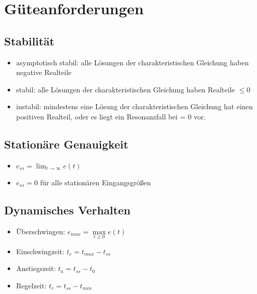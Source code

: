 \documentclass[german]{latex4ei/latex4ei_sheet}
\begin{document}
\section{Güteanforderungen}
\begin{sectionbox}
        \subsection{Stabilität}
    \vspace{1mm}
    \begin{itemize}
        \item asymptotisch stabil: alle Lösungen der charakteristischen Gleichung haben negative Realteile
        \item stabil: alle Lösungen der charakteristischen Gleichung haben Realteile $\leq 0$
        \item instabil: mindestens eine Lösung der charakteristischen Gleichung hat einen positiven Realteil, oder es liegt ein Resonanzfall bei \Re{\lambda} = 0 vor.
    \end{itemize}

    \subsection{Stationäre Genauigkeit}
    \vspace{1mm}
    \begin{itemize}
        \item $e_{ss} = \lim_{t \to \infty} e(t)$
        \item $e_{ss} = 0$ für alle stationären Eingangsgrößen
    \end{itemize}
    \subsection{Dynamisches Verhalten}
    \vspace{1mm}
    \begin{itemize}
        \item Überschwingen: $e_{max} = \max\limits_{t \geq 0} e(t)$
        \item Einschwingzeit: $t_e = t_{max} - t_{ss}$
        \item Anstiegszeit: $t_a = t_{ss} - t_0$
        \item Regelzeit: $t_r = t_{ss} - t_{min}$
    \end{itemize}

\end{sectionbox}
\end{document}
